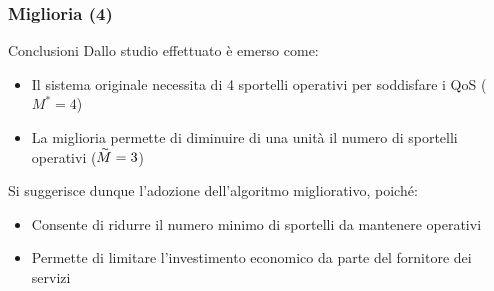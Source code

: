 \documentclass[
	usepdftitle=false,
	xcolor={table, dvipsnames},
	hyperref={
		pdftitle={Studio delle prestazioni di un Ufficio Postale ispirato a Poste Italiane},
    	pdfauthor={A. Chillotti, C. Cuffaro e S. Tiberi}
    }
]{beamer}
\begin{document}
\begin{frame}
\frametitle{Miglioria (4)}
\begin{block}{Conclusioni}
Dallo studio effettuato è emerso come:
\begin{itemize}
\item Il sistema originale necessita di 4 sportelli operativi per soddisfare i QoS ($M^* = 4$)
\item La miglioria permette di diminuire di una unità il numero di sportelli operativi ($\accentset{\sim}M = 3$)
\end{itemize}
\vspace{1em}
Si suggerisce dunque l'adozione dell'algoritmo migliorativo, poiché:
\begin{itemize}
\item Consente di ridurre il numero minimo di sportelli da mantenere operativi
\item Permette di limitare l'investimento economico da parte del fornitore dei servizi
\end{itemize}
\end{block}
\end{frame}
\end{document}
